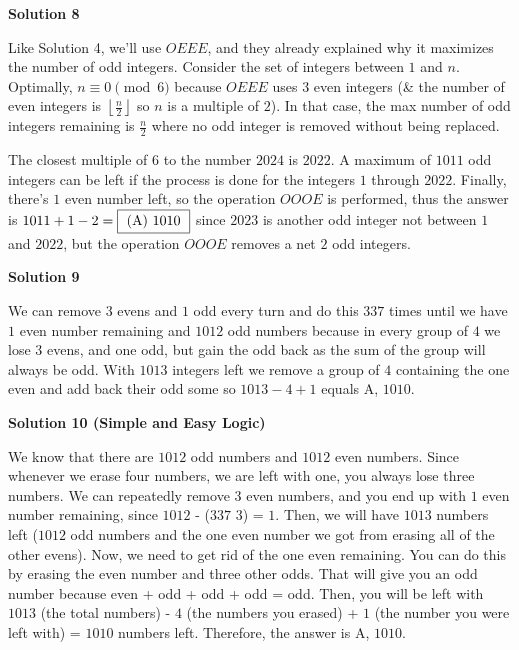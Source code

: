 \begin{enumerate}
 



\textbf{Solution 8}

Like Solution 4, we'll use $OEEE$, and they already explained why it maximizes the number of odd integers. Consider the set of integers between $1$ and $n$. Optimally, $n \equiv 0 \pmod{6}$ because $OEEE$ uses $3$ even integers (& the number of even integers is $\left \lfloor \frac{n}{2} \right\rfloor$ so $n$ is a multiple of $2$). In that case, the max number of odd integers remaining is $\frac{n}{2}$ where no odd integer is removed without being replaced.

 The closest multiple of $6$ to the number $2024$ is $2022$. A maximum of $1011$ odd integers can be left if the process is done for the integers $1$ through $2022$. Finally, there's $1$ even number left, so the operation $OOOE$ is performed, thus the answer is $1011 + 1 - 2 = \fbox{ (A) 1010 }$ since $2023$ is another odd integer not between $1$ and $2022$, but the operation $OOOE$ removes a net $2$ odd integers.

 



\textbf{Solution 9}

We can remove $3$ evens and $1$ odd every turn and do this $337$ times until we have $1$ even number remaining and $1012$ odd numbers because in every group of $4$ we lose $3$ evens, and one odd, but gain the odd back as the sum of the group will always be odd. With $1013$ integers left we remove a group of $4$ containing the one even and add back their odd some so $1013 - 4 + 1$ equals A, $\boxed{1010}$.

 



\textbf{Solution 10 (Simple and Easy Logic)}

We know that there are $1012$ odd numbers and $1012$ even numbers. Since whenever we erase four numbers, we are left with one, you always lose three numbers. We can repeatedly remove $3$ even numbers, and you end up with $1$ even number remaining, since $1012$ - ($337$ \times $3$) = $1$. Then, we will have $1013$ numbers left ($1012$ odd numbers and the one even number we got from erasing all of the other evens). Now, we need to get rid of the one even remaining. You can do this by erasing the even number and three other odds. That will give you an odd number because even + odd + odd + odd = odd. Then, you will be left with $1013$ (the total numbers) - $4$ (the numbers you erased) + $1$ (the number you were left with) = $1010$ numbers left. Therefore, the answer is A, $\boxed{1010}$.


\end{enumerate}
